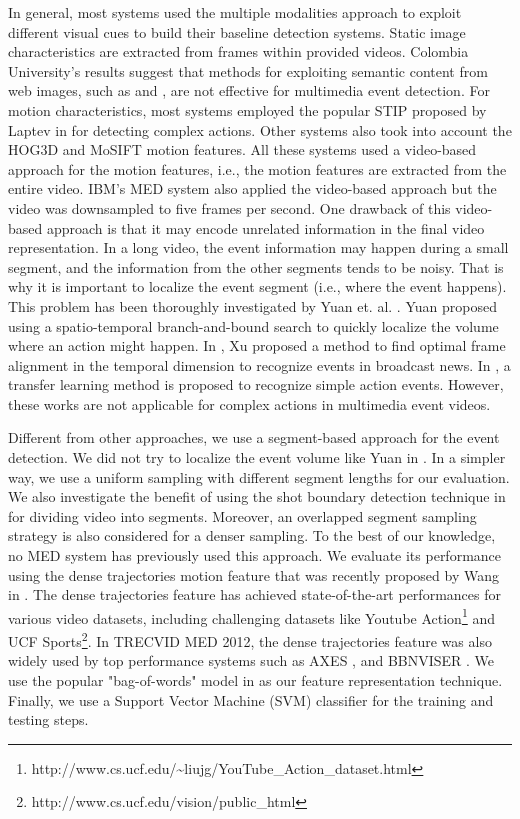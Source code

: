 In general, most systems used the multiple modalities approach to exploit different visual cues to build their baseline detection systems. Static image characteristics are extracted from frames within provided videos. Colombia University's results \cite{trecvid10:cuucf} suggest that methods for exploiting semantic content from web images, such as \cite{duan2012exploiting} and \cite{trecvid10:cuucf}, are not effective for multimedia event detection. For motion characteristics, most systems employed the popular STIP proposed by Laptev in \cite{Laptev:2005:SIP} for detecting complex actions. Other systems also took into account the HOG3D \cite{Klaser08BMVC} and MoSIFT \cite{Chen_mosift} motion features. All these systems used a video-based approach for the motion features, i.e., the motion features are extracted from the entire video. IBM's MED system \cite{trecvid10:IBM} also applied the video-based approach but the video was downsampled to five frames per second. One drawback of this video-based approach is that it may encode unrelated information in the final video representation. In a long video, the event information may happen during a small segment, and the information from the other segments tends to be noisy. That is why it is important to localize the event segment (i.e., where the event happens). This problem has been thoroughly investigated by Yuan et. al. \cite{Yuan2011PAMI}. Yuan proposed using a spatio-temporal branch-and-bound search to quickly localize the volume where an action might happen. In \cite{xu2008video}, Xu proposed a method to find optimal frame alignment in the
temporal dimension to recognize events in broadcast news. In \cite{duan2012visual}, a transfer learning method is proposed to recognize simple action events. However, these works are not applicable for complex actions in multimedia event videos.

Different from other approaches, we use a segment-based approach for the event detection. We did not try to localize the event volume like Yuan in \cite{Yuan2011PAMI}. In a simpler way, we use a uniform sampling with different segment lengths for our evaluation. We also investigate the benefit of using the shot boundary detection technique in \cite{Guimaraes:2003} for dividing video into segments. Moreover, an overlapped segment sampling strategy is also considered for a denser sampling. To the best of our knowledge, no MED system has previously used this approach. We evaluate its performance using the dense trajectories motion feature that was recently proposed by Wang in \cite{wang:2011:inria-00583818:1}. The dense trajectories feature has achieved state-of-the-art performances for various video datasets, including challenging datasets like Youtube Action\footnote{http://www.cs.ucf.edu/{\textasciitilde}liujg/YouTube\_Action\_dataset.html} and UCF Sports\footnote{http://www.cs.ucf.edu/vision/public\_html}. In TRECVID MED 2012, the dense trajectories feature was also widely used by top performance systems such as AXES \cite{oneata:hal-00746874}, and BBNVISER \cite{NIST-TRECVID12:BBN-DVMM}. We use the popular "bag-of-words" model in \cite{Csurka04visualcategorization} as our feature representation technique. Finally, we use a Support Vector Machine (SVM) classifier for the training and testing steps.


